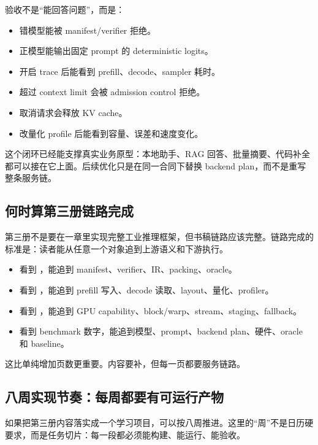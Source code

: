 验收不是“能回答问题”，而是：

\begin{itemize}
  \item 错模型能被 manifest/verifier 拒绝。
  \item 正模型能输出固定 prompt 的 deterministic logits。
  \item 开启 trace 后能看到 prefill、decode、sampler 耗时。
  \item 超过 context limit 会被 admission control 拒绝。
  \item 取消请求会释放 KV cache。
  \item 改量化 profile 后能看到容量、误差和速度变化。
\end{itemize}

这个闭环已经能支撑真实业务原型：本地助手、RAG 回答、批量摘要、代码补全都可以接在它上面。后续优化只是在同一合同下替换 backend plan，而不是重写整条服务链。

\subsection{何时算第三册链路完成}

第三册不是要在一章里实现完整工业推理框架，但书稿链路应该完整。链路完成的标准是：读者能从任意一个对象追到上游语义和下游执行。

\begin{itemize}
  \item 看到 ，能追到 manifest、verifier、IR、packing、oracle。
  \item 看到 ，能追到 prefill 写入、decode 读取、layout、量化、profiler。
  \item 看到 ，能追到 GPU capability、block/warp、stream、staging、fallback。
  \item 看到 benchmark 数字，能追到模型、prompt、backend plan、硬件、oracle 和 baseline。
\end{itemize}

这比单纯增加页数更重要。内容要补，但每一页都要服务链路。

\subsection{八周实现节奏：每周都要有可运行产物}

如果把第三册内容落实成一个学习项目，可以按八周推进。这里的“周”不是日历硬要求，而是任务切片：每一段都必须能构建、能运行、能验收。

